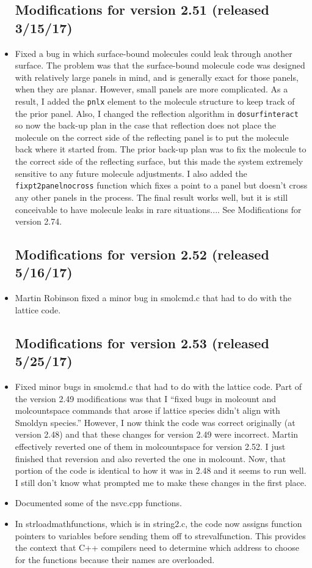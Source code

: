 \documentclass {scrbook}
\newcommand {\ttt} {\texttt}
\begin{document}
\begin{itemize}
\subsection{Modifications for version 2.51 (released 3/15/17)}
\item Fixed a bug in which surface-bound molecules could leak through another surface. The problem was that the surface-bound molecule code was designed with relatively large panels in mind, and is generally exact for those panels, when they are planar. However, small panels are more complicated. As a result, I added the \ttt{pnlx} element to the molecule structure to keep track of the prior panel. Also, I changed the reflection algorithm in \ttt{dosurfinteract} so now the back-up plan in the case that reflection does not place the molecule on the correct side of the reflecting panel is to put the molecule back where it started from. The prior back-up plan was to fix the molecule to the correct side of the reflecting surface, but this made the system extremely sensitive to any future molecule adjustments. I also added the \ttt{fixpt2panelnocross} function which fixes a point to a panel but doesn't cross any other panels in the process. The final result works well, but it is still conceivable to have molecule leaks in rare situations.... See Modifications for version 2.74.

\subsection{Modifications for version 2.52 (released 5/16/17)}
\item Martin Robinson fixed a minor bug in smolcmd.c that had to do with the lattice code.

\subsection{Modifications for version 2.53 (released 5/25/17)}
\item Fixed minor bugs in smolcmd.c that had to do with the lattice code. Part of the version 2.49 modifications was that I ``fixed bugs in molcount and molcountspace commands that arose if lattice species didn't align with Smoldyn species.'' However, I now think the code was correct originally (at version 2.48) and that these changes for version 2.49 were incorrect. Martin effectively reverted one of them in molcountspace for version 2.52. I just finished that reversion and also reverted the one in molcount. Now, that portion of the code is identical to how it was in 2.48 and it seems to run well. I still don't know what prompted me to make these changes in the first place.
\item Documented some of the nsvc.cpp functions.
\item In strloadmathfunctions, which is in string2.c, the code now assigns function pointers to variables before sending them off to strevalfunction. This provides the context that C++ compilers need to determine which address to choose for the functions because their names are overloaded.


\end{itemize}
\end{document}
